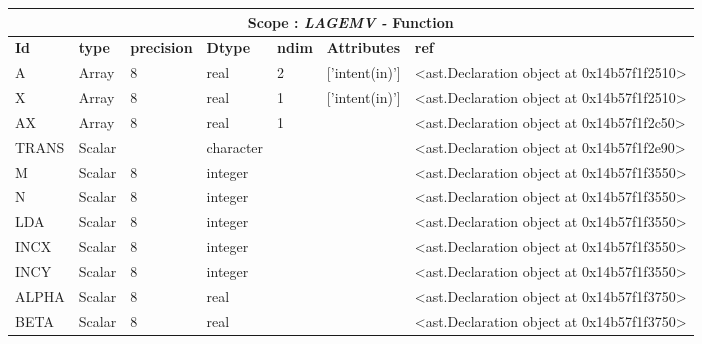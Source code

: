 \documentclass{report}
\begin{document}
\begin{center}
\begin{longtable}{|p{3.5cm}|p{1.5cm}|p{1.5cm}|p{1.5cm}|p{1cm}|p{2cm}|p{4cm}| }
\hline
\multicolumn{7}{|c|}{\textbf{Scope : \qquad}  \textbf{\textit{LAGEMV - }Function}}\\ 
\hline
\textbf{Id} & \textbf{type} & \textbf{precision} & \textbf{Dtype} & \textbf{ndim} & \textbf{Attributes} & \textbf{ref} \\\hline

A & Array & 8 & real & 2 & ['intent(in)'] & <ast.Declaration object at 0x14b57f1f2510> \\\hline

X & Array & 8 & real & 1 & ['intent(in)'] & <ast.Declaration object at 0x14b57f1f2510> \\\hline

AX & Array & 8 & real & 1 &  & <ast.Declaration object at 0x14b57f1f2c50> \\\hline

TRANS & Scalar &  & character &  &  & <ast.Declaration object at 0x14b57f1f2e90> \\\hline

M & Scalar & 8 & integer &  &  & <ast.Declaration object at 0x14b57f1f3550> \\\hline

N & Scalar & 8 & integer &  &  & <ast.Declaration object at 0x14b57f1f3550> \\\hline

LDA & Scalar & 8 & integer &  &  & <ast.Declaration object at 0x14b57f1f3550> \\\hline

INCX & Scalar & 8 & integer &  &  & <ast.Declaration object at 0x14b57f1f3550> \\\hline

INCY & Scalar & 8 & integer &  &  & <ast.Declaration object at 0x14b57f1f3550> \\\hline

ALPHA & Scalar & 8 & real &  &  & <ast.Declaration object at 0x14b57f1f3750> \\\hline

BETA & Scalar & 8 & real &  &  & <ast.Declaration object at 0x14b57f1f3750> \\\hline

\end{longtable}
\end{center}

 \vspace{1cm}
\end{document}
